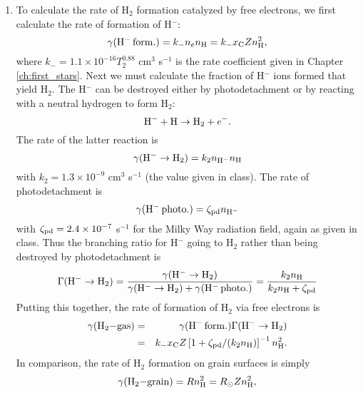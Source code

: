 \begin{enumerate}
\begin{enumerate}
\item To calculate the rate of H$_2$ formation catalyzed by free electrons, we first calculate the rate of formation of H$^-$:
\begin{displaymath}
\gamma({\rm H}^{-}\,{\rm form.}) = k_{-} n_e n_{\rm H} = k_{-} x_{\rm C} Z n_{\rm H}^2,
\end{displaymath}
where $k_{-} = 1.1\times 10^{-16} T_2^{0.88}$ cm$^3$ s$^{-1}$ is the rate coefficient given in Chapter \ref{ch:first_stars}. Next we must calculate the fraction of H$^-$ ions formed that yield H$_2$. The H$^-$ can be destroyed either by photodetachment or by reacting with a neutral hydrogen to form H$_2$:
\begin{displaymath}
{\rm H}^{-} + {\rm H} \rightarrow {\rm H}_2 + e^{-}.
\end{displaymath}
The rate of the latter reaction is
\begin{displaymath}
\gamma({\rm H}^{-}\rightarrow{\rm H}_2) = k_2 n_{{\rm H}^-} n_{\rm H}
\end{displaymath}
with $k_2 = 1.3\times 10^{-9}$ cm$^3$ s$^{-1}$ (the value given in class). The rate of photodetachment is
\begin{displaymath}
\gamma({\rm H}^{-}\,{\rm photo.}) = \zeta_{\rm pd} n_{{\rm H}^-}
\end{displaymath}
with $\zeta_{\rm pd} = 2.4\times 10^{-7}$ s$^{-1}$ for the Milky Way radiation field, again as given in class. Thus the branching ratio for H$^{-}$ going to H$_2$ rather than being destroyed by photodetachment is
\begin{displaymath}
\Gamma({\rm H}^{-}\rightarrow{\rm H}_2) = \frac{\gamma({\rm H}^{-}\rightarrow{\rm H}_2)}{\gamma({\rm H}^{-}\rightarrow{\rm H}_2) + \gamma({\rm H}^{-}\,{\rm photo.})} = \frac{k_2 n_{\rm H}}{k_2 n_{\rm H}+\zeta_{\rm pd}}
\end{displaymath}
Putting this together, the rate of formation of H$_2$ via free electrons is
\begin{eqnarray*}
\gamma({\rm H}_2{\rm - gas}) & = & \gamma({\rm H}^{-}\,{\rm form.}) \Gamma({\rm H}^{-}\rightarrow{\rm H}_2) \\
& = & k_{-} x_{\rm C} Z  \left[1+ \zeta_{\rm pd}/(k_2 n_{\rm H})\right]^{-1} n_{\rm H}^2. 
\end{eqnarray*}
In comparison, the rate of H$_2$ formation on grain surfaces is simply
\begin{displaymath}
\gamma({\rm H}_2{\rm - grain}) = R n_{\rm H}^2 = R_{\odot} Z n_{\rm H}^2,
\end{displaymath}

\end{enumerate}
\end{enumerate}

